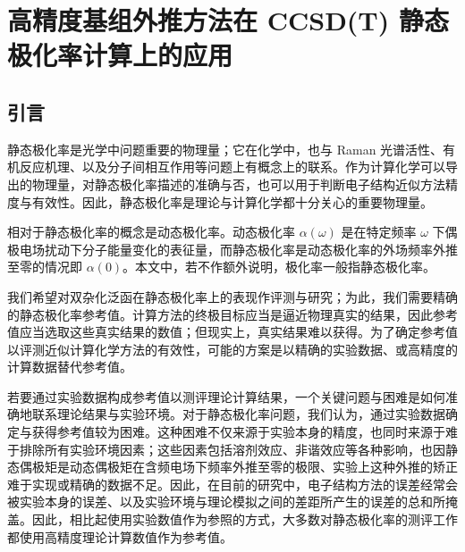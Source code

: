 
\chapter{高精度基组外推方法在 CCSD(T) 静态极化率计算上的应用}
\label{sec.5.title}

\section{引言}

静态极化率是光学中问题重要的物理量\cite{Marder-Stucky.ACS.1991}；它在化学中，也与 Raman 光谱活性\cite{Wilson-Cross.Dover.1955}、有机反应机理\cite{Xing-Pei.HEP.2005}、以及分子间相互作用\cite{Cohen-Tannoudji-Laloe.Wiley.2020}等问题上有概念上的联系。作为计算化学可以导出的物理量，对静态极化率描述的准确与否，也可以用于判断电子结构近似方法精度与有效性。因此，静态极化率是理论与计算化学都十分关心的重要物理量。

相对于静态极化率的概念是动态极化率。动态极化率 $\alpha(\omega)$ 是在特定频率 $\omega$ 下偶极电场扰动下分子能量变化的表征量，而静态极化率是动态极化率的外场频率外推至零的情况即 $\alpha(0)$。本文中，若不作额外说明，极化率一般指静态极化率。

我们希望对双杂化泛函在静态极化率上的表现作评测与研究；为此，我们需要精确的静态极化率参考值。计算方法的终极目标应当是逼近物理真实的结果，因此参考值应当选取这些真实结果的数值；但现实上，真实结果难以获得。为了确定参考值以评测近似计算化学方法的有效性，可能的方案是以精确的实验数据、或高精度的计算数据替代参考值。

若要通过实验数据构成参考值以测评理论计算结果，一个关键问题与困难是如何准确地联系理论结果与实验环境\cite{Mata-Suhm.ACIE.2017}。对于静态极化率问题，我们认为，通过实验数据确定与获得参考值较为困难。这种困难不仅来源于实验本身的精度，也同时来源于难于排除所有实验环境因素；这些因素包括溶剂效应、非谐效应等各种影响，也因静态偶极矩是动态偶极矩在含频电场下频率外推至零的极限、实验上这种外推的矫正难于实现或精确的数据不足。因此，在目前的研究中，电子结构方法的误差经常会被实验本身的误差、以及实验环境与理论模拟之间的差距所产生的误差的总和所掩盖\cite{Hickey-Rowley.JPCA.2014}。因此，相比起使用实验数值作为参照的方式\cite{Hickey-Rowley.JPCA.2014}，大多数对静态极化率的测评工作都使用高精度理论计算数值作为参考值\cite{Hammond-Xantheas.JCP.2009, Huzak-Deleuze.JCP.2013, Wu-Thakkar.CPL.2015, Kozlowska-Bartkowiak.PCCP.2019, Hait-Head-Gordon.PCCP.2018, Beizaei-Sauer.JPCA.2021}。

